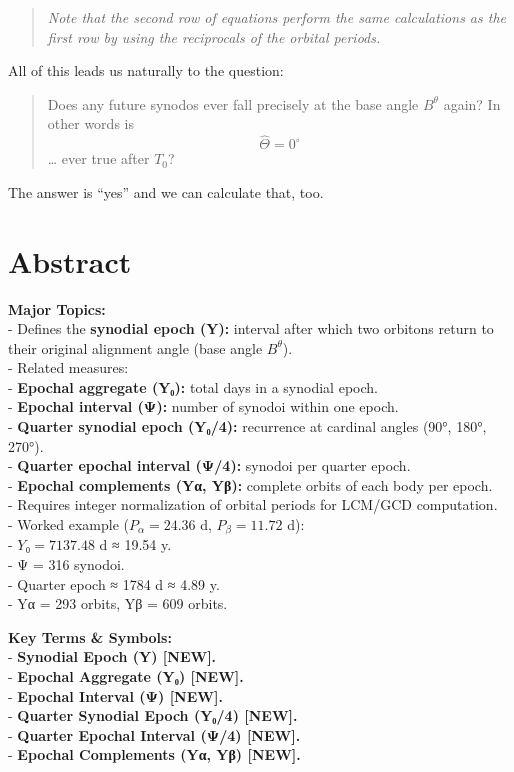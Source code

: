 \documentclass[
  letterpaper,
]{book}
\begin{document}
\begin{quote}
\emph{Note that the second row of equations perform the same
calculations as the first row by using the reciprocals of the orbital
periods.}
\end{quote}

All of this leads us naturally to the question:

\begin{quote}
Does any future synodos ever fall precisely at the base angle
\(B^\theta\) again? In other words is \[
\widehat{\Theta} = 0^\circ
\] \ldots{} ever true after \(T_0\)?
\end{quote}

The answer is ``yes'' and we can calculate that, too.

\section{Abstract}\label{abstract-34}

\textbf{Major Topics:}\\
- Defines the \textbf{synodial epoch (Y):} interval after which two
orbitons return to their original alignment angle (base angle
\(B^\theta\)).\\
- Related measures:\\
- \textbf{Epochal aggregate (Y₀):} total days in a synodial epoch.\\
- \textbf{Epochal interval (Ψ):} number of synodoi within one epoch.\\
- \textbf{Quarter synodial epoch (Y₀/4):} recurrence at cardinal angles
(90°, 180°, 270°).\\
- \textbf{Quarter epochal interval (Ψ/4):} synodoi per quarter epoch.\\
- \textbf{Epochal complements (Yα, Yβ):} complete orbits of each body
per epoch.\\
- Requires integer normalization of orbital periods for LCM/GCD
computation.\\
- Worked example (\(P_\alpha = 24.36\) d, \(P_\beta = 11.72\) d):\\
- \(Y₀ = 7137.48\) d ≈ 19.54 y.\\
- Ψ = 316 synodoi.\\
- Quarter epoch ≈ 1784 d ≈ 4.89 y.\\
- Yα = 293 orbits, Yβ = 609 orbits.

\textbf{Key Terms \& Symbols:}\\
- \textbf{Synodial Epoch (Y) {[}NEW{]}.}\\
- \textbf{Epochal Aggregate (Y₀) {[}NEW{]}.}\\
- \textbf{Epochal Interval (Ψ) {[}NEW{]}.}\\
- \textbf{Quarter Synodial Epoch (Y₀/4) {[}NEW{]}.}\\
- \textbf{Quarter Epochal Interval (Ψ/4) {[}NEW{]}.}\\
- \textbf{Epochal Complements (Yα, Yβ) {[}NEW{]}.}
\end{document}
